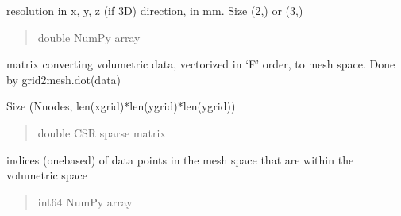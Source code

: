 \documentclass[letterpaper,10pt,english]{sphinxmanual}
\begin{document}
\begin{fulllineitems}
\begin{fulllineitems}
\begin{quote}
\begin{description}
\end{description}\end{quote}

\end{fulllineitems}


\begin{fulllineitems}
\label{\detokenize{_autosummary/nirfasterff.base.data.meshvol:nirfasterff.base.data.meshvol.res}}
\pysigstartsignatures
\pysigline
{}
\pysigstopsignatures
\sphinxAtStartPar
resolution in x, y, z (if 3D) direction, in mm. Size (2,) or (3,)
\begin{quote}\begin{description}
\sphinxAtStartPar
double NumPy array

\end{description}\end{quote}

\end{fulllineitems}


\begin{fulllineitems}
\label{\detokenize{_autosummary/nirfasterff.base.data.meshvol:nirfasterff.base.data.meshvol.grid2mesh}}
\pysigstartsignatures
\pysigline
{}
\pysigstopsignatures
\sphinxAtStartPar
matrix converting volumetric data, vectorized in ‘F’ order, to mesh space. Done by grid2mesh.dot(data)

\sphinxAtStartPar
Size (Nnodes, len(xgrid)*len(ygrid)*len(ygrid))
\begin{quote}\begin{description}
\sphinxAtStartPar
double CSR sparse matrix

\end{description}\end{quote}

\end{fulllineitems}


\begin{fulllineitems}
\label{\detokenize{_autosummary/nirfasterff.base.data.meshvol:nirfasterff.base.data.meshvol.meshingrid}}
\pysigstartsignatures
\pysigline
{}
\pysigstopsignatures
\sphinxAtStartPar
indices (one\sphinxhyphen{}based) of data points in the mesh space that are within the volumetric space
\begin{quote}\begin{description}
\sphinxAtStartPar
int64 NumPy array


\end{description}
\end{quote}
\end{fulllineitems}
\end{fulllineitems}
\end{document}
